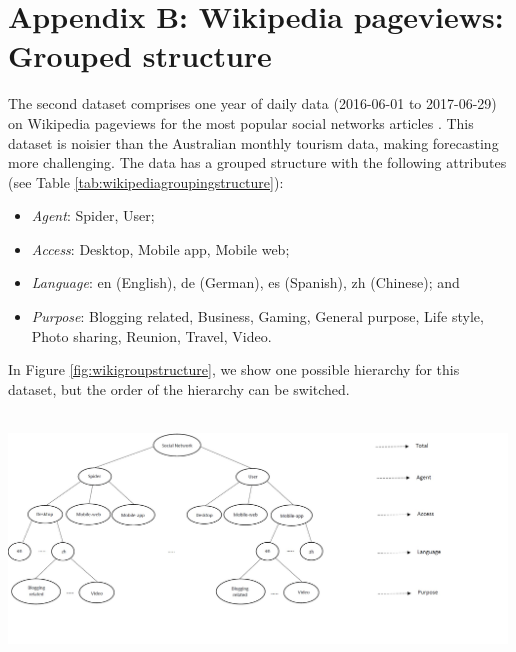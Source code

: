 \documentclass[11pt,a4paper,]{article}
\providecommand{\tightlist}{%
  \setlength{\itemsep}{0pt}\setlength{\parskip}{0pt}}
\let\origfigure\figure
\let\endorigfigure\endfigure
\renewenvironment{figure}[1][2] {
    \expandafter\origfigure\expandafter[!htbp]
} {
    \endorigfigure
}
\begin{document}
\hypertarget{appendix-b-wikipedia-pageviews-grouped-structure}{%
\section{Appendix B: Wikipedia pageviews: Grouped structure}\label{appendix-b-wikipedia-pageviews-grouped-structure}}

The second dataset comprises one year of daily data (2016-06-01 to 2017-06-29) on Wikipedia pageviews for the most popular social networks articles \autocite{ashouri2018}. This dataset is noisier than the Australian monthly tourism data, making forecasting more challenging. The data has a grouped structure with the following attributes (see Table \ref{tab:wikipediagroupingstructure}):

\begin{itemize}
\tightlist
\item
  \emph{Agent}: Spider, User;
\item
  \emph{Access}: Desktop, Mobile app, Mobile web;
\item
  \emph{Language}: en (English), de (German), es (Spanish), zh (Chinese); and
\item
  \emph{Purpose}: Blogging related, Business, Gaming, General purpose, Life style, Photo sharing, Reunion, Travel, Video.
\end{itemize}

In Figure \ref{fig:wikigroupstructure}, we show one possible hierarchy for this dataset, but the order of the hierarchy can be switched.

\begin{figure}

{\centering \includegraphics[width=500px,height=250px]{Paper-Figures/Wiki_group_structure} 

}

\caption{One of the possible hierarchical structures for the Wikipedia pageview dataset.}\label{fig:wikigroupstructure}
\end{figure}
\end{document}
